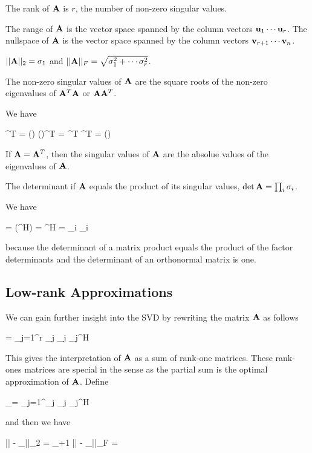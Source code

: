 \begin{theorem} The rank of $\mathbf{A}$ is $r$, the number of non-zero singular values. \end{theorem}

\begin{theorem} The range of $\mathbf{A}$ is the vector space spanned by the column vectors $\mathbf{u}_1 \cdots \mathbf{u}_r$. The nullspace of $\mathbf{A}$ is the vector space spanned by the column vectors $\mathbf{v}_{r+1} \cdots \mathbf{v}_n$. \end{theorem}

\begin{theorem} $|| \mathbf{A} ||_2 = \sigma_1$ and $|| \mathbf{A} ||_F = \sqrt{\sigma_1^2 + \cdots \sigma_r^2}$. \end{theorem}

\begin{theorem} The non-zero singular values of $\mathbf{A}$ are the square roots of the non-zero eigenvalues of $\mathbf{A}^T \mathbf{A}$ or $\mathbf{A} \mathbf{A}^T$.\end{theorem}

We have

\bee
\Abf \Abf^T = (\Ubf \Sigmabf \Vbf) (\Ubf \Sigmabf \Vbf)^T = \Ubf \Sigmabf \Vbf \Vbf^T \Sigmabf \Ubf^T = \Ubf (\Sigmabf \Sigmabf) \Ubf
\eee

\begin{theorem} If $\mathbf{A} = \mathbf{A}^T$, then the singular values of $\mathbf{A}$ are the absolue values of the eigenvalues of $\mathbf{A}$. \end{theorem}

\begin{theorem} The determinant if $\mathbf{A}$ equals the product of its singular values, $\det \mathbf{A} = \prod_i \sigma_i$. \end{theorem}

We have

\bee
\det \Abf = \det (\hat \Ubf \hat\Sigmabf \Vbf^H) = \det \hat\Ubf \det \hat\Sigmabf \det \Vbf^H = \prod_i \sigma_i
\eee

because the determinant of a matrix product equals the product of the factor determinants and the determinant of an orthonormal matrix is one.


\subsection{Low-rank Approximations}

We can gain further insight into the SVD by rewriting the matrix $\mathbf{A}$ as follows

\bee
\Abf = \sum_{j=1}^r \sigma_j \ubf_j \vbf_j^H
\eee

This gives the interpretation of $\mathbf{A}$ as a sum of rank-one matrices. These rank-ones matrices are special in the sense as the partial sum is the optimal approximation of $\mathbf{A}$. Define

\bee
\Abf_\nu = \sum_{j=1}^\nu \sigma_j \ubf_j \vbf_j^H
\eee

and then we have

\bee
|| \Abf - \Abf_\nu ||_2 = \sigma_{\nu+1} \quad {} \quad || \Abf - \Abf_\nu ||_F = 
\eee



